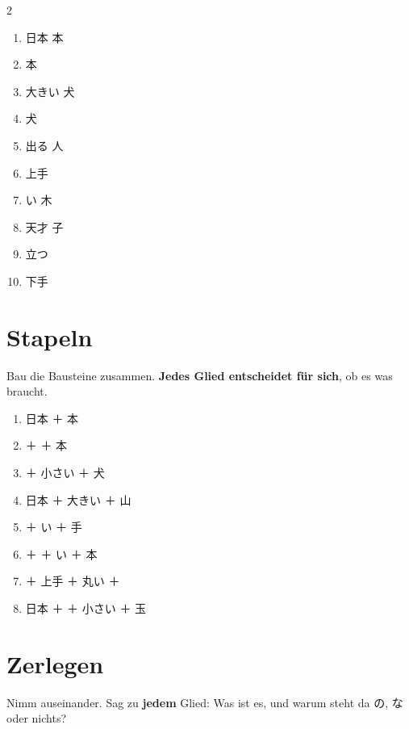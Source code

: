 \documentclass[11pt,a4paper,DIV=12]{scrartcl}
\begin{document}
\begin{multicols}{2}
\begin{enumerate}[itemsep=6pt]
\item 日本 \lin[1cm] 本
\item {} \lin[1cm] 本
\item 大きい \lin[1cm] 犬
\item {} \lin[1cm] 犬
\item 出る \lin[1cm] 人
\item 上手 \lin[1cm] 
\item {}い \lin[1cm] 木
\item 天才 \lin[1cm] 子
\item 立つ \lin[1cm] 
\item 下手 \lin[1cm] 
\end{enumerate}
\end{multicols}

\section{Stapeln}

Bau die Bausteine zusammen. \textbf{Jedes Glied entscheidet für sich}, ob es was braucht.

\begin{enumerate}[itemsep=8pt]
\item 日本 ＋ 本 \hfill \lin[7cm]
\item {} ＋  ＋ 本 \hfill \lin[7cm]
\item {} ＋ 小さい ＋ 犬 \hfill \lin[7cm]
\item 日本 ＋ 大きい ＋ 山 \hfill \lin[7cm]
\item {} ＋ い ＋ 手 \hfill \lin[7cm]
\item {} ＋  ＋ い ＋ 本 \hfill \lin[6cm]
\item {} ＋ 上手 ＋ 丸い ＋  \hfill \lin[6cm]
\item 日本 ＋  ＋ 小さい ＋ 玉 \hfill \lin[6cm]
\end{enumerate}

\section{Zerlegen}

Nimm auseinander. Sag zu \textbf{jedem} Glied: Was ist es, und warum steht da の, な
oder nichts?
\end{document}
